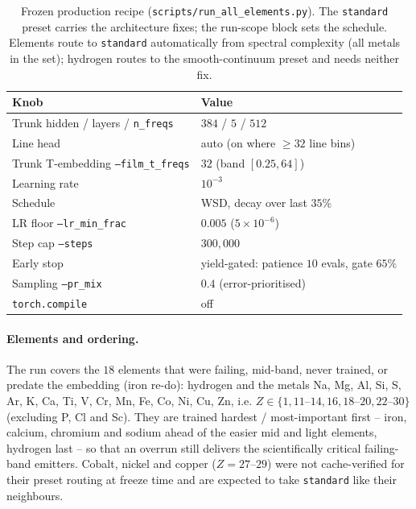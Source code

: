 \documentclass[11pt,a4paper]{article}
\newcommand{\code}[1]{\texttt{#1}}
\begin{document}
\begin{table}[t]
\centering
\caption{Frozen production recipe (\code{scripts/run\_all\_elements.py}).
The \code{standard} preset carries the architecture fixes; the run-scope
block sets the schedule. Elements route to \code{standard} automatically
from spectral complexity (all metals in the set); hydrogen routes to the
smooth-continuum preset and needs neither fix.}
\label{tab:production}
\begin{tabular}{ll}
\hline
Knob & Value \\
\hline
Trunk hidden / layers / \code{n\_freqs} & $384$ / $5$ / $512$ \\
Line head & auto (on where $\ge32$ line bins) \\
Trunk T-embedding \code{--film\_t\_freqs} & $32$ (band $[0.25,64]$) \\
Learning rate & $10^{-3}$ \\
Schedule & WSD, decay over last $35\%$ \\
LR floor \code{--lr\_min\_frac} & $0.005$ ($5\times10^{-6}$) \\
Step cap \code{--steps} & $300{,}000$ \\
Early stop & yield-gated: patience $10$ evals, gate $65\%$ \\
Sampling \code{--pr\_mix} & $0.4$ (error-prioritised) \\
\code{torch.compile} & off \\
\hline
\end{tabular}
\end{table}

\paragraph{Elements and ordering.} The run covers the $18$ elements that
were failing, mid-band, never trained, or predate the embedding (iron
re-do): hydrogen and the metals Na, Mg, Al, Si, S, Ar, K, Ca, Ti, V, Cr,
Mn, Fe, Co, Ni, Cu, Zn, i.e.
$Z\in\{1,11$--$14,16,18$--$20,22$--$30\}$ (excluding P, Cl and Sc). They are
trained hardest / most-important first -- iron, calcium, chromium and sodium
ahead of the easier mid and light elements, hydrogen last -- so that an
overrun still delivers the scientifically critical failing-band emitters.
Cobalt, nickel and copper ($Z=27$--$29$) were not cache-verified for their
preset routing at freeze time and are expected to take \code{standard} like
their neighbours.
\end{document}
